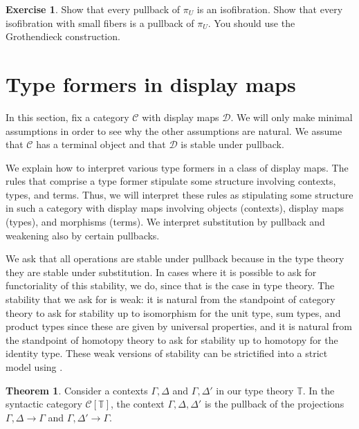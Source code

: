\documentclass{article}
\theoremstyle{definition}
\newtheorem{theorem}[definition]{Theorem}
\newtheorem{exercise}[definition]{Exercise}
\newcommand{\T}{\mathbb T}
\newcommand{\C}{\mathcal C}
\newcommand{\D}{\mathcal D}
\newcommand{\syncat}[1]{\C [#1]}
\begin{document}
\begin{exercise}
    Show that every pullback of $\pi_U$ is an isofibration. Show that every isofibration with small fibers is a pullback of $\pi_U$. You should use the Grothendieck construction.
\end{exercise}

\section{Type formers in display maps}

In this section, fix a category $\C$ with display maps $\D$. We will only make minimal assumptions in order to see why the other assumptions are natural. We assume that $\C$ has a terminal object and that $\D$ is stable under pullback.

We explain how to interpret various type formers in a class of display maps. The rules that comprise a type former stipulate some structure involving contexts, types, and terms. Thus, we will interpret these rules as stipulating some structure in such a category with display maps involving objects (contexts), display maps (types), and morphisms (terms). We interpret substitution by pullback and weakening also by certain pullbacks.

We ask that all operations are stable under pullback because in the type theory they are stable under substitution. In cases where it is possible to ask for functoriality of this stability, we do, since that is the case in type theory. The stability that we ask for is weak: it is natural from the standpoint of category theory to ask for stability up to isomorphism for the unit type, sum types, and product types since these are given by universal properties, and it is natural from the standpoint of homotopy theory to ask for stability up to homotopy for the identity type. These weak versions of stability can be strictified into a strict model using \cite{lumsdaine-warren}.

\begin{theorem}
    Consider a contexts $\Gamma, \Delta$ and $\Gamma, \Delta'$ in our type theory $\T$.
    In the syntactic category $\syncat{\T}$, the context $\Gamma, \Delta, \Delta'$ is the pullback of the projections $\Gamma, \Delta \to \Gamma$ and $\Gamma, \Delta' \to \Gamma$.
\end{theorem}
\end{document}
